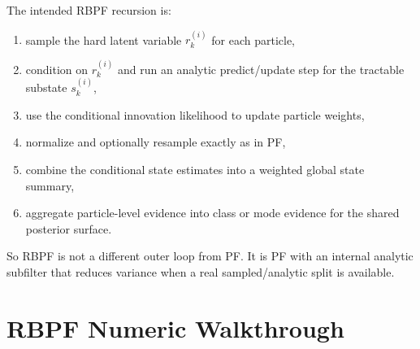 \documentclass[11pt]{article}
\begin{document}
The intended RBPF recursion is:
\begin{enumerate}[leftmargin=1.5em]
    \item sample the hard latent variable \(r_k^{(i)}\) for each particle,
    \item condition on \(r_k^{(i)}\) and run an analytic predict/update step
    for the tractable substate \(s_k^{(i)}\),
    \item use the conditional innovation likelihood to update particle
    weights,
    \item normalize and optionally resample exactly as in PF,
    \item combine the conditional state estimates into a weighted global state
    summary,
    \item aggregate particle-level evidence into class or mode evidence for the
    shared posterior surface.
\end{enumerate}
So RBPF is not a different outer loop from PF. It is PF with an internal
analytic subfilter that reduces variance when a real sampled/analytic split is
available.

\section{RBPF Numeric Walkthrough}
\end{document}
